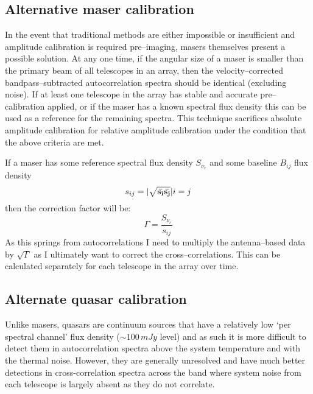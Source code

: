 	 
	\subsection{Alternative maser calibration}
		\label{sec:altmasercal}
		In the event that traditional methods are either impossible or insufficient and amplitude calibration is required  pre--imaging, masers themselves present a possible solution. At any one time, if the angular size of a maser is smaller than the primary beam of all telescopes in an array, then the velocity--corrected bandpass--subtracted autocorrelation spectra should be identical (excluding noise). If at least one telescope in the array has stable and accurate pre--calibration applied, or if the maser has a known spectral flux density this can be used as a reference for the remaining spectra. This technique sacrifices absolute amplitude calibration for relative amplitude calibration under the condition that the above criteria are met.

		If a maser has some reference spectral flux density $S_{\nu_r}$ and some baseline $B_{ij}$ flux density $$ s_{ij} = | \sqrt{\bf\bar{s_i} \bar{s_j}}| i=j$$ then the correction factor will be: $$\Gamma = \frac{S_{\nu_r}}{s_{ij}}$$ As this springs from autocorrelations I need to multiply the antenna--based data by $\sqrt{\Gamma}$ as I ultimately want to correct the cross--correlations. This can be calculated separately for each telescope in the array over time.

	\subsection{Alternate quasar calibration} \label{sec:altquascal}
		Unlike masers, quasars are continuum sources that have a relatively low `per spectral channel' flux density ($\sim100\,mJy$ level) and as such it is more difficult to detect them in autocorrelation spectra above the system temperature and with the thermal noise. However, they are generally unresolved and have much better detections in cross-correlation spectra across the band where system noise from each telescope is largely absent as they do not correlate. 
		

